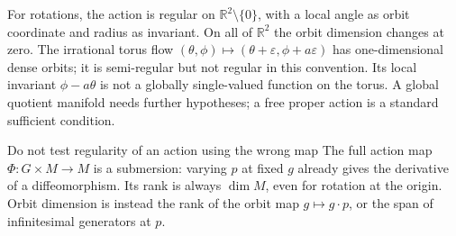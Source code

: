 \documentclass[11pt,a4paper]{article}
\numberwithin{equation}{section}
\theoremstyle{definition}
\theoremstyle{plain}
\theoremstyle{remark}
\newcommand{\R}{\mathbb R}
\begin{document}
For rotations, the action is regular on $\R^2\setminus\{0\}$, with a local angle as orbit coordinate and radius as invariant. On all of $\R^2$ the orbit dimension changes at zero. The irrational torus flow $(\theta,\phi)\mapsto(\theta+\varepsilon,\phi+a\varepsilon)$ has one-dimensional dense orbits; it is semi-regular but not regular in this convention. Its local invariant $\phi-a\theta$ is not a globally single-valued function on the torus. A global quotient manifold needs further hypotheses; a free proper action is a standard sufficient condition.

\begin{idea}{Do not test regularity of an action using the wrong map}
The full action map $\Phi:G\times M\to M$ is a submersion: varying $p$ at fixed $g$ already gives the derivative of a diffeomorphism. Its rank is always $\dim M$, even for rotation at the origin. Orbit dimension is instead the rank of the orbit map $g\mapsto g\cdot p$, or the span of infinitesimal generators at $p$.
\end{idea}
\end{document}
